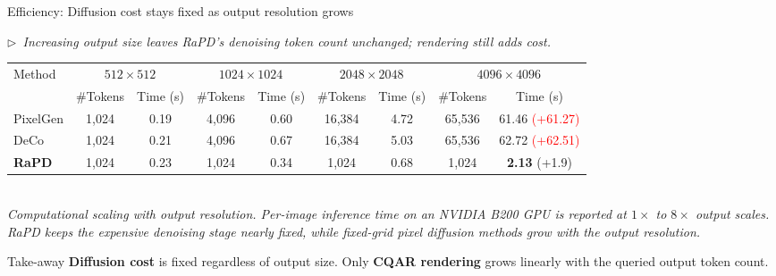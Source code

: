 \documentclass[aspectratio=169,10pt]{beamer}
\newcommand{\hl}[1]{\textcolor{rapdorange}{\textbf{#1}}}
\newcommand{\story}[1]{%
  {\color{rapdgray}\itshape\footnotesize $\triangleright$~#1\par}\vspace{0.3em}}
\begin{document}
\begin{frame}{Efficiency: \alert{Diffusion cost stays fixed} as output resolution grows}
  \story{Increasing output size leaves RaPD's denoising token count unchanged; rendering still adds cost.}
  \vspace{0.5em}
  \begin{center}
  \scriptsize
  \setlength{\tabcolsep}{4pt}
  \begin{tabular}{l|cc|cc|cc|cc}
    \toprule
    \multirow{2}{*}{Method} &
    \multicolumn{2}{c|}{$512\!\times\!512$} &
    \multicolumn{2}{c|}{$1024\!\times\!1024$} &
    \multicolumn{2}{c|}{$2048\!\times\!2048$} &
    \multicolumn{2}{c}{$4096\!\times\!4096$} \\
     &
    \#Tokens & Time (s) &
    \#Tokens & Time (s) &
    \#Tokens & Time (s) &
    \#Tokens & Time (s) \\
    \midrule
    PixelGen        & 1{,}024 & 0.19 & 4{,}096  & 0.60 & 16{,}384 & 4.72 & 65{,}536 & 61.46 \textcolor{red}{(+61.27)} \\
    DeCo            & 1{,}024 & 0.21 & 4{,}096  & 0.67 & 16{,}384 & 5.03 & 65{,}536 & 62.72 \textcolor{red}{(+62.51)} \\
    \rowcolor{lightbluepurple}
    \textbf{RaPD}   & 1{,}024 & 0.23 & 1{,}024  & 0.34 & 1{,}024  & 0.68 & 1{,}024  & \textbf{2.13} {\color{rapdorange}(+1.9)} \\
    \bottomrule
  \end{tabular}\\[0.4em]
  {\scriptsize\itshape\color{rapdgray}Computational scaling with output resolution. Per-image inference time on an NVIDIA B200 GPU is reported at $1\!\times\!$ to $8\!\times\!$ output scales. RaPD keeps the expensive denoising stage nearly fixed, while fixed-grid pixel diffusion methods grow with the output resolution.}
  \end{center}
  \vspace{0.5em}
  \begin{block}{Take-away}
    \centering
    \hl{Diffusion cost} is fixed regardless of output size.
    Only \hl{CQAR rendering} grows linearly with the queried output token count.
  \end{block}
\end{frame}
\end{document}
